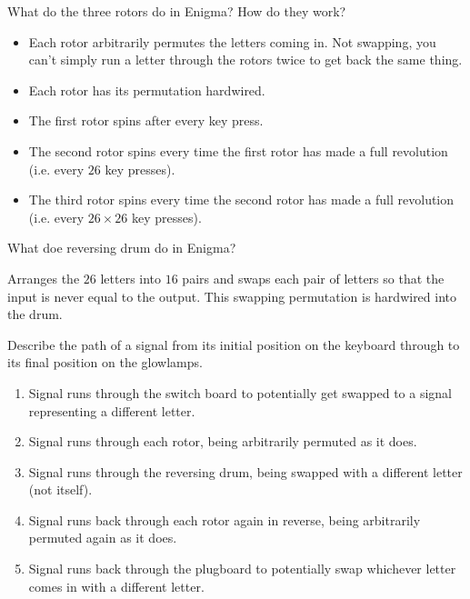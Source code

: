 \documentclass{article}
\newcounter{qcounter}
\newcommand{\showqcounter}{\theqcounter}
\newcommand{\question}{\vspace{5mm}\addtocounter{qcounter}{1}\vspace{5mm}{\bf Q\showqcounter: }}
\newcommand{\answer}{\vspace{5mm}{\bf A\showqcounter: }}
\begin{document}
\question What do the three rotors do in Enigma? How do they work?

\answer
  \begin{itemize}
    \item Each rotor arbitrarily permutes the letters coming in. Not swapping, you can't simply run a letter through the rotors twice to get back the same thing.
    \item Each rotor has its permutation hardwired. 
    \item The first rotor spins after every key press.
    \item The second rotor spins every time the first rotor has made a full revolution (i.e. every $26$ key presses).
    \item The third rotor spins every time the second rotor has made a full revolution (i.e. every $26 \times 26$ key presses).
  \end{itemize}


\question What doe reversing drum do in Enigma?

\answer Arranges the $26$ letters into $16$ pairs and swaps each pair of letters so that the input is never equal to the output. 
  This swapping permutation is hardwired into the drum.


\question Describe the path of a signal from its initial position on the keyboard through to its final position on the glowlamps.

\answer
  \begin{enumerate}
    \item Signal runs through the switch board to potentially get swapped to a signal representing a different letter.
    \item Signal runs through each rotor, being arbitrarily permuted as it does.
    \item Signal runs through the reversing drum, being swapped with a different letter (not itself).
    \item Signal runs back through each rotor again in reverse, being arbitrarily permuted again as it does.
    \item Signal runs back through the plugboard to potentially swap whichever letter comes in with a different letter. 
  \end{enumerate}
\end{document}

